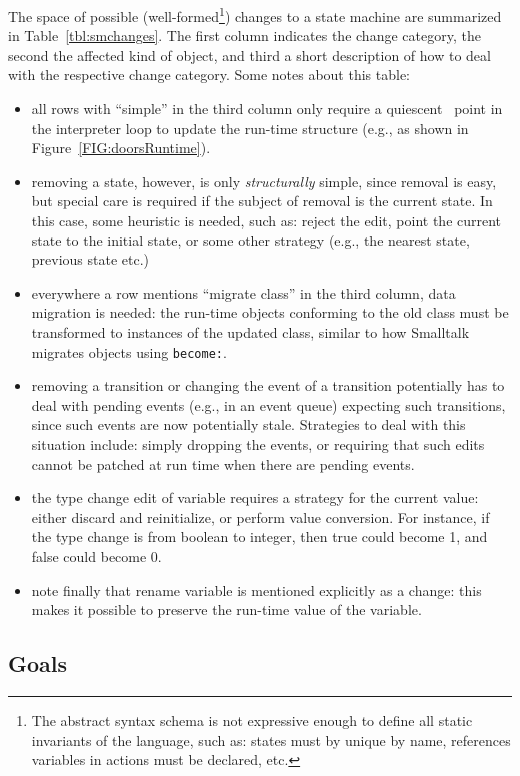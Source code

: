 \documentclass[english,submission]{programming}
\begin{document}
The space of possible (well-formed\footnote{The abstract syntax schema is not expressive enough to define all static invariants of the language, such as: states must by unique by name, references variables in actions must be declared, etc.}) changes to a state machine are summarized in Table~\ref{tbl:smchanges}.
The first column indicates the change category, the second the affected kind of object, and third a short description of how to deal with the respective change category. Some notes about this table:
\begin{itemize}
\item all rows with ``simple'' in the third column only require a quiescent~\cite{Tranquility} point in the interpreter loop to update the run-time structure (e.g., as shown in Figure~\ref{FIG:doorsRuntime}).
\item removing a state, however, is only \textit{structurally} simple, since removal is easy, but special care is required if the subject of removal is the current state. In this case, some heuristic is needed, such as: reject the edit, point the current state to the initial state, or some other strategy (e.g., the nearest state, previous state etc.)
\item everywhere a row mentions ``migrate class'' in the third column, data migration is needed: the run-time objects conforming to the old class must be transformed to instances of the updated class, similar to how Smalltalk migrates objects using \lstinline{become:}.
\item removing a transition or changing the event of a transition potentially has to deal with pending events (e.g., in an event queue) expecting such transitions, since such events are now potentially stale. Strategies to deal with this situation include: simply dropping the events, or requiring that such edits cannot be patched at run time when there are pending events.
\item the type change edit of variable requires a strategy for the current value: either discard and reinitialize, or perform value conversion. For instance, if the type change is from boolean to integer, then true could become 1, and false could become 0.
\item note finally that rename variable is mentioned explicitly as a change: this makes it possible to preserve the run-time value of the variable.
\end{itemize}

\subsection{Goals}
\end{document}
